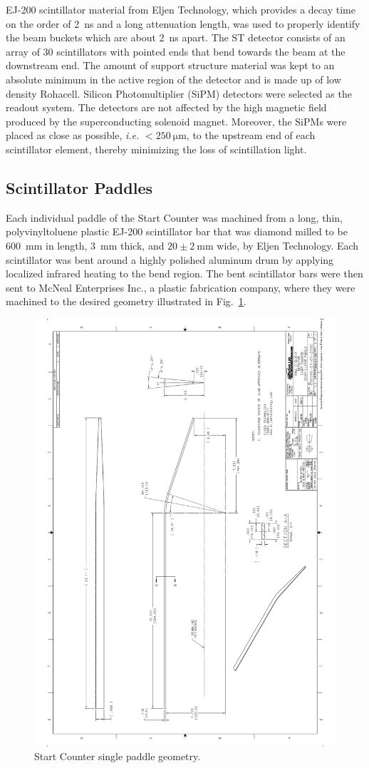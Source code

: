 EJ-200 scintillator material from Eljen Technology\cite{eljen}, which provides a decay time on the order of 2~ns and a long attenuation length\cite{ej200_specs}, was used to properly identify the beam buckets which are about 2~ns apart.  The ST detector consists of an array of 30 scintillators with pointed ends that bend towards the beam at the downstream end. The amount of support structure material was kept to an absolute minimum in the active region of the detector and is made up of low density Rohacell\textregistered\cite{rohacell}. Silicon Photomultiplier (SiPM) detectors were selected as the readout system. The detectors are not affected by the high magnetic field produced by the superconducting solenoid magnet. Moreover, the SiPMs were placed as close as possible, \textit{i.e.} $\mathrm{< 250\ \mu m}$, to the upstream end of each scintillator element, thereby minimizing the loss of scintillation light\cite{pooser16}.

\subsection{Scintillator Paddles}

Each individual paddle of the Start Counter was machined from a long, thin, polyvinyltoluene plastic EJ-200 scintillator bar that was diamond milled to be 600~mm in length, 3~mm thick, and $\mathrm{20 \pm 2\ mm}$ wide, by Eljen Technology.  Each scintillator was bent around a highly polished aluminum drum by applying localized infrared heating to the bend region.  The bent scintillator bars were then sent to McNeal Enterprises Inc.\cite{mcneal}, a plastic fabrication company, where they were machined to the desired geometry illustrated in Fig.~\ref{fig:Scintillator Geometry}.
\begin{figure}[!htb]
	\centering
	\includegraphics[width=0.7\columnwidth,angle=270.]{design/figs/Scint_Geo}
	\caption[Start Counter single paddle geometry]{Start Counter single paddle geometry.}
	\label{fig:Scintillator Geometry}
\end{figure}

